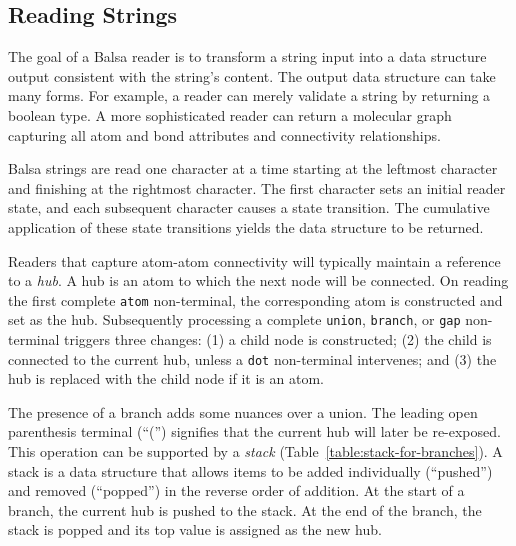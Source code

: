 \documentclass{article}
\def\ttt{\texttt}
\begin{document}
\subsection*{Reading Strings}
\label{reading-strings}

The goal of a Balsa reader is to transform a string input into a data structure output consistent with the string's content. The output data structure can take many forms. For example, a reader can merely validate a string by returning a boolean type. A more sophisticated reader can return a molecular graph capturing all atom and bond attributes and connectivity relationships.

Balsa strings are read one character at a time starting at the leftmost character and finishing at the rightmost character. The first character sets an initial reader state, and each subsequent character causes a state transition. The cumulative application of these state transitions yields the data structure to be returned.

Readers that capture atom-atom connectivity will typically maintain a reference to a \textit{hub}. A hub is an atom to which the next node will be connected. On reading the first complete \ttt{atom} non-terminal, the corresponding atom is constructed and set as the hub. Subsequently processing a complete \ttt{union}, \ttt{branch}, or \ttt{gap} non-terminal triggers three changes: (1) a child node is constructed; (2) the child is connected to the current hub, unless a \ttt{dot} non-terminal intervenes; and (3) the hub is replaced with the child node if it is an atom.

The presence of a branch adds some nuances over a union. The leading open parenthesis terminal (\enquote{(}) signifies that the current hub will later be re-exposed. This operation can be supported by a \textit{stack} (Table~\ref{table:stack-for-branches}). A stack is a data structure that allows items to be added individually (\enquote{pushed}) and removed (\enquote{popped}) in the reverse order of addition. At the start of a branch, the current hub is pushed to the stack. At the end of the branch, the stack is popped and its top value is assigned as the new hub.
\end{document}
